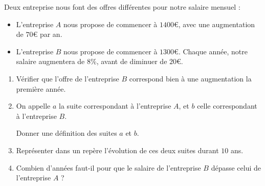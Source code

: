 \documentclass[
	classe=$1^{ere}STI2D$
]{évaluation}
\begin{document}
\begin{exercice}[5]
	Deux entreprise nous font des offres différentes pour notre salaire mensuel :
	\begin{itemize}
		\item L'entreprise $A$ nous propose de commencer à $1400$€, avec une augmentation de $70$€ par an.
		\item L'entreprise $B$ nous propose de commencer à $1300$€. Chaque année, notre salaire augmentera de $8$\%, avant de diminuer de $20$€.
	\end{itemize}
	\begin{enumerate}
		\item Vérifier que l'offre de l'entreprise $B$ correspond bien à une augmentation la première année.
		\item On appelle $a$ la suite correspondant à l'entreprise $A$, et $b$ celle correspondant à l'entreprise $B$.

		      Donner une définition des suites $a$ et $b$.
		\item Représenter dans un repère l'évolution de ces deux suites durant $10$ ans.

		\item Combien d'années faut-il pour que le salaire de l'entreprise $B$ dépasse celui de l'entreprise $A$ ?
	\end{enumerate}
\end{exercice}
\end{document}
